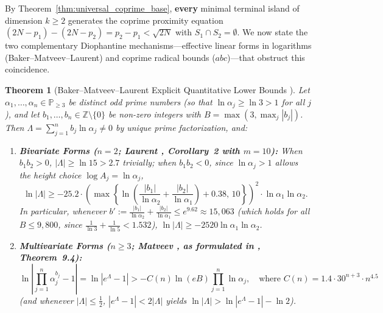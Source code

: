 \documentclass[11pt,a4paper]{article}
\newtheorem{theorem}{Theorem}[section]
\theoremstyle{definition}
\begin{document}
By Theorem~\ref{thm:universal_coprime_base}, \textbf{every} minimal terminal island of dimension $k \ge 2$ generates the coprime proximity equation $(2N - p_1) - (2N - p_2) = p_2 - p_1 < \sqrt{2N}$ with $S_1 \cap S_2 = \emptyset$. We now state the two complementary Diophantine mechanisms---effective linear forms in logarithms (Baker--Matveev--Laurent) and coprime radical bounds ($abc$)---that obstruct this coincidence.

\begin{theorem}[Baker--Matveev--Laurent Explicit Quantitative Lower Bounds \cite{baker1966, matveev2000, bugeaud2006, laurent2008}]
\label{thm:baker_matveev}
Let $\alpha_1, \dots, \alpha_n \in \mathbb{P}_{\ge 3}$ be distinct odd prime numbers (so that $\ln \alpha_j \ge \ln 3 > 1$ for all $j$), and let $b_1, \dots, b_n \in \mathbb{Z} \setminus \{0\}$ be non-zero integers with $B = \max(3, \max_j |b_j|)$. Then $\Lambda = \sum_{j=1}^n b_j \ln \alpha_j \neq 0$ by unique prime factorization, and:
\begin{enumerate}
    \item \textbf{Bivariate Forms ($n = 2$; Laurent \cite{laurent2008}, Corollary~2 with $m = 10$):} When $b_1 b_2 > 0$, $|\Lambda| \ge \ln 15 > 2.7$ trivially; when $b_1 b_2 < 0$, since $\ln \alpha_j > 1$ allows the height choice $\log A_j = \ln \alpha_j$,
    \begin{equation}
    \label{eq:laurent_exact}
    \ln |\Lambda| \ge -25.2 \cdot \left( \max\left\{ \ln\left( \frac{|b_1|}{\ln \alpha_2} + \frac{|b_2|}{\ln \alpha_1} \right) + 0.38, \, 10 \right\} \right)^2 \cdot \ln \alpha_1 \ln \alpha_2.
    \end{equation}
    In particular, whenever $b' := \frac{|b_1|}{\ln \alpha_2} + \frac{|b_2|}{\ln \alpha_1} \le e^{9.62} \approx 15{,}063$ (which holds for all $B \le 9{,}800$, since $\frac{1}{\ln 3} + \frac{1}{\ln 5} < 1.532$), $\ln|\Lambda| \ge -2520 \ln \alpha_1 \ln \alpha_2$.
    \item \textbf{Multivariate Forms ($n \ge 3$; Matveev \cite{matveev2000}, as formulated in \cite{bugeaud2006}, Theorem~9.4):}
    \begin{equation}
    \label{eq:matveev_exact}
    \ln \left| \prod_{j=1}^n \alpha_j^{b_j} - 1 \right| = \ln |e^{\Lambda} - 1| > -C(n) \ln(eB) \prod_{j=1}^n \ln \alpha_j, \quad \text{where } C(n) = 1.4 \cdot 30^{n+3} \cdot n^{4.5}
    \end{equation}
    (and whenever $|\Lambda| \le \frac{1}{2}$, $|e^\Lambda - 1| < 2|\Lambda|$ yields $\ln|\Lambda| > \ln|e^\Lambda - 1| - \ln 2$).
\end{enumerate}
\end{theorem}
\end{document}

